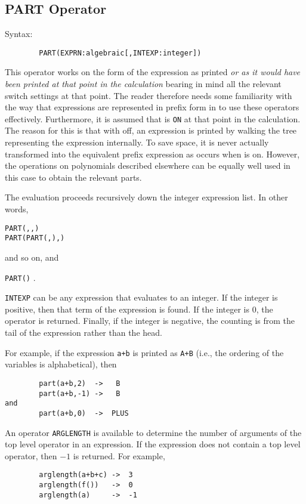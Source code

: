 \subsection{PART Operator}
\hypertarget{operator:PART}{}
Syntax:
\begin{verbatim}
        PART(EXPRN:algebraic[,INTEXP:integer])
\end{verbatim}

This operator works on the form of the expression as printed \emph{or as it
would have been printed at that point in the calculation} bearing in mind
all the relevant switch settings at that point.  The reader therefore
needs some familiarity with the way that expressions are represented in
prefix form in {\REDUCE} to use these operators effectively.  Furthermore,
it is assumed that  is \texttt{ON} at that point in the calculation.
The reason for this is that with  off, an expression is printed
by walking the tree representing the expression internally.  To save
space, it is never actually transformed into the equivalent prefix
expression as occurs when  is on.  However, the operations on
polynomials described elsewhere can be equally well used in this case to
obtain the relevant parts.

The evaluation proceeds recursively down the integer expression list. In
other words,
\begin{syntaxtable}
 \texttt{PART(}\texttt{,}\texttt{,}\texttt{)} \\
  \qquad \rightarrow \texttt{PART(PART(}\texttt{,}\texttt{),}\texttt{)}
\end{syntaxtable}
 and so on, and
\begin{syntax}
  \texttt{PART(}\texttt{)}  \rightarrow {} .
\end{syntax}
\texttt{INTEXP} can be any expression that evaluates to an integer.  If the
integer is positive, then that term of the expression is found.  If the
integer is 0, the operator is returned.  Finally, if the integer is
negative, the counting is from the tail of the expression rather than the
head.

For example, if the expression \texttt{a+b} is printed as \texttt{A+B} (i.e.,
the ordering of the variables is alphabetical), then
\begin{verbatim}
        part(a+b,2)  ->   B
        part(a+b,-1) ->   B
and
        part(a+b,0)  ->  PLUS
\end{verbatim}
\hypertarget{operator:ARGLENGTH}{}
An operator \texttt{ARGLENGTH} is available to determine
the number of arguments of the top level operator in an expression.  If
the expression does not contain a top level operator, then $-1$ is returned.
For example,
\begin{verbatim}
        arglength(a+b+c) ->  3
        arglength(f())   ->  0
        arglength(a)     ->  -1
\end{verbatim}

